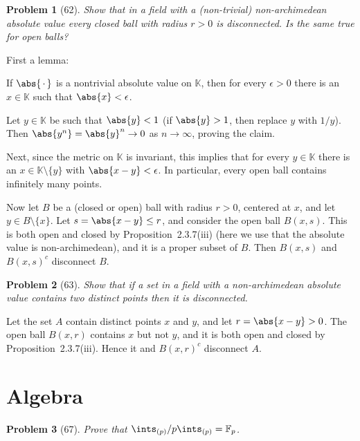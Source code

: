 \documentclass[a4paper, 11pt]{memoir}
\newenvironment{displaytheorem}{%
	\begin{displayquote}\itshape%
}{%
	\end{displayquote}%
}
\theoremstyle{plaincustomnumber}
\newtheorem{problem}{Problem}
\theoremstyle{changedotbreakcustomnumber}
\newcommand{\field}{\mathbb{F}}
\newcommand{\fieldK}{\mathbb{K}}
\begin{document}
\begin{problem}[62]
    Show that in a field with a (non-trivial) non-archimedean absolute value every closed ball with radius $r > 0$ is disconnected. Is the same true for open balls?
\end{problem}

\begin{solution}
    First a lemma:
    \begin{displaytheorem}
        If $\abs{\,\cdot\,}$ is a nontrivial absolute value on $\fieldK$, then for every $\epsilon > 0$ there is an $x \in \fieldK$ such that $\abs{x} < \epsilon$.
    \end{displaytheorem}
    Let $y \in \fieldK$ be such that $\abs{y} < 1$ (if $\abs{y} > 1$, then replace $y$ with $1/y$). Then $\abs{y^n} = \abs{y}^n \to 0$ as $n \to \infty$, proving the claim.

    Next, since the metric on $\fieldK$ is invariant, this implies that for every $y \in \fieldK$ there is an $x \in \fieldK \setminus \{y\}$ with $\abs{x-y} < \epsilon$. In particular, every open ball contains infinitely many points.
    
    Now let $B$ be a (closed or open) ball with radius $r > 0$, centered at $x$, and let $y \in B \setminus \{x\}$. Let $s = \abs{x - y} \leq r$, and consider the open ball $B(x,s)$. This is both open and closed by Proposition~2.3.7(iii) (here we use that the absolute value is non-archimedean), and it is a proper subset of $B$. Then $B(x,s)$ and $B(x,s)^c$ disconnect $B$.
\end{solution}


\begin{problem}[63]
    Show that if a set in a field with a non-archimedean absolute value contains two distinct points then it is disconnected.
\end{problem}

\begin{solution}
    Let the set $A$ contain distinct points $x$ and $y$, and let $r = \abs{x-y} > 0$. The open ball $B(x,r)$ contains $x$ but not $y$, and it is both open and closed by Proposition~2.3.7(iii). Hence it and $B(x,r)^c$ disconnect $A$.
\end{solution}


\section{Algebra}

\begin{problem}[67]
    Prove that $\ints_{(p)} / p\ints_{(p)} = \field_p$.
\end{problem}
\end{document}
